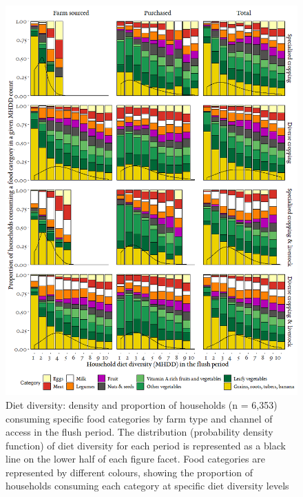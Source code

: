 \begin{figure}[H]
\includegraphics[width=1\textwidth]{Appendix/Ch6_4.png}
    \captionsetup{singlelinecheck = false, justification=justified} %
  \caption{Diet diversity: density and proportion of households (n = 6,353) consuming specific food categories by farm type and channel of access in the flush period. The distribution (probability density function) of diet diversity for each period is represented as a black line on the lower half of each figure facet. Food categories are represented by different colours, showing the proportion of households consuming each category at specific diet diversity levels}
  \label{fig:A_4}
\end{figure}

